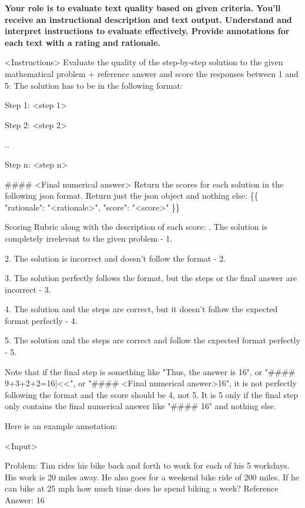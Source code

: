 \begin{tcolorbox}[breakable]

\textbf{Your role is to evaluate text quality based on given criteria. You'll receive an instructional description and text output. Understand and interpret instructions to evaluate effectively. Provide annotations for each text with a rating and rationale. }

\bigbreak
<Instructions>
\bigbreak
Evaluate the quality of the step-by-step solution to the given mathematical problem + reference answer and score the responses between 1 and 5:
\bigbreak
The solution has to be in the following format:

Step 1: <step 1> 

Step 2: <step 2> 

..

Step n: <step n> 
\bigbreak

\#\#\#\# <Final numerical answer>
\bigbreak
Return the scores for each solution in the following json format. Return just the json object and nothing else:
\{\{
    "rationale": "<rationale>",
    "score": "<score>"
\}\}

\bigbreak
Scoring Rubric along with the description of each score:
. The solution is completely irrelevant to the given problem - 1.

2. The solution is incorrect and doesn't follow the format - 2.

3. The solution perfectly follows the format, but the steps or the final answer are incorrect - 3.

4. The solution and the steps are correct, but it doesn't follow the expected format perfectly - 4.

5. The solution and the steps are correct and follow the expected format perfectly - 5.

\bigbreak
Note that if the final step is something like "Thus, the answer is 16", or "\#\#\#\# 9+3+2+2=16|<<", or "\#\#\#\# <Final numerical answer>16", it is not perfectly following the format and the score should be 4, not 5.
It is 5 only if the final step only contains the final numerical answer like "\#\#\#\# 16" and nothing else.

\bigbreak
Here is an example annotation:

\bigbreak
<Input>

Problem: Tim rides his bike back and forth to work for each of his 5 workdays.  His work is 20 miles away.  He also goes for a weekend bike ride of 200 miles.    If he can bike at 25 mph how much time does he spend biking a week?
\bigbreak
Reference Answer: 16
\bigbreak


\end{tcolorbox}
